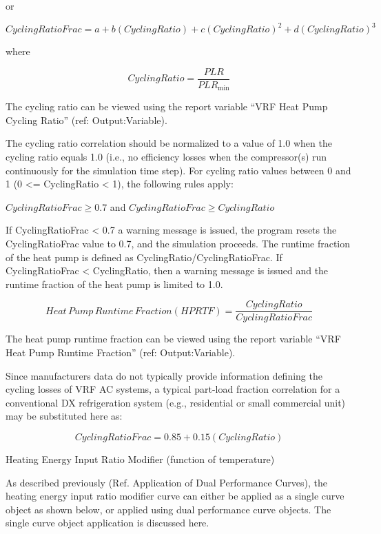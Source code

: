 or

\begin{equation}
  CyclingRatioFrac = a + b \left( CyclingRatio \right) + c \left( CyclingRatio \right)^2 + d \left( CyclingRatio \right)^3
\end{equation}

where

\begin{equation}
  CyclingRatio = \frac{PLR}{PLR_{\min }}
\end{equation}

The cycling ratio can be viewed using the report variable ``VRF Heat Pump Cycling Ratio'' (ref: Output:Variable).

The cycling ratio correlation should be normalized to a value of 1.0 when the cycling ratio equals 1.0 (i.e., no efficiency losses when the compressor(s) run continuously for the simulation time step). For cycling ratio values between 0 and 1 (0 <= CyclingRatio < 1), the following rules apply:

\(CyclingRatioFrac \ge 0.7\)   and   \(CyclingRatioFrac \ge CyclingRatio\)

If CyclingRatioFrac < 0.7 a warning message is issued, the program resets the CyclingRatioFrac value to 0.7, and the simulation proceeds. The runtime fraction of the heat pump is defined as CyclingRatio/CyclingRatioFrac. If CyclingRatioFrac < CyclingRatio, then a warning message is issued and the runtime fraction of the heat pump is limited to 1.0.

\begin{equation}
  Heat\,Pump\,Runtime\,Fraction \left( HPRTF \right) = \frac{CyclingRatio}{CyclingRatioFrac}
\end{equation}

The heat pump runtime fraction can be viewed using the report variable ``VRF Heat Pump Runtime Fraction'' (ref: Output:Variable).

Since manufacturers data do not typically provide information defining the cycling losses of VRF AC systems, a typical part-load fraction correlation for a conventional DX refrigeration system (e.g., residential or small commercial unit) may be substituted here as:

\begin{equation}
  CyclingRatioFrac = 0.85 + 0.15(CyclingRatio)
\end{equation}

Heating Energy Input Ratio Modifier (function of temperature)

As described previously (Ref. Application of Dual Performance Curves), the heating energy input ratio modifier curve can either be applied as a single curve object as shown below, or applied using dual performance curve objects. The single curve object application is discussed here.

